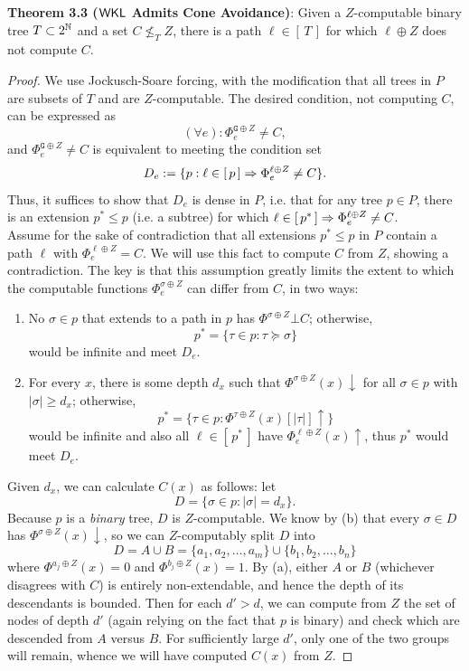 \documentclass{amsart}
\begin{document}
	\noindent \textbf{Theorem 3.3 ($\sf{WKL}$ Admits Cone Avoidance)}: Given a $Z$-computable binary tree $T\subset 2^{\mathbb{N}}$ and a set $C\nleq_T Z$, there is a path $\ell\in [\,T\,]$ for which $\ell\oplus Z$ does not compute $C$. 
	\begin{proof}
		We use Jockusch-Soare forcing, with the modification that all trees in $P$ are subsets of $T$ and are $Z$-computable. The desired condition, not computing $C$, can be expressed as
		$$
		(\forall e): \Phi_e^{\mathtt{G}\oplus Z}\neq C,
		$$
		and $\Phi_e^{\mathtt{G}\oplus Z} \neq C$ is equivalent to meeting the condition set
		$$
		D_e := \{p: \ell \in [\, p \,] \Rightarrow \Phi_e^{\ell\oplus Z}\neq C\}.
		$$
		Thus, it suffices to show that $D_e$ is dense in $P$, i.e. that for any tree $p\in P$, there is an extension $p^*\leq p$ (i.e. a subtree) for which $\ell\in [\,p^*\,] \Rightarrow \Phi_e^{\ell\oplus Z}\neq C$.\\
		
		Assume for the sake of contradiction that all extensions $p^*\leq p$ in $P$ contain a path $\ell$ with $\Phi_e^{\ell\oplus Z}=C$. We will use this fact to compute $C$ from $Z$, showing a contradiction. The key is that this assumption greatly limits the extent to which the computable functions $\Phi_e^{\sigma\oplus Z}$ can differ from $C$, in two ways:
		\begin{enumerate}[label=(\alph*)]
			\item No $\sigma\in p$ that extends to a path in $p$ has $\Phi^{\sigma\oplus Z}\bot C$; otherwise,
			$$p^*=\{\tau\in p :\tau\succeq \sigma \}$$ 
			would be infinite and meet $D_e$.
			\item For every $x$, there is some depth $d_x$ such that $\Phi^{\sigma\oplus Z}(x)\downarrow$ for all $\sigma\in p$ with $|\sigma|\geq d_x$; otherwise, 
			$$p^*=\{\tau\in p:\Phi^{\tau\oplus Z}(x)[|\tau|]\uparrow \}$$
			would be infinite and also all $\ell\in [\,p^*\,]$ have $\Phi_e^{\ell\oplus Z}(x)\uparrow$, thus $p^*$ would meet $D_e$.
		\end{enumerate}
		Given $d_x$, we can calculate $C(x)$ as follows: let 
		$$D = \{\sigma\in p : |\sigma| = d_x\}.$$
		Because $p$ is a \textit{binary} tree, $D$ is $Z$-computable. We know by (b) that every $\sigma\in D$ has $\Phi^{\sigma\oplus Z}(x)\downarrow$, so we can $Z$-computably split $D$ into 
		$$
		D = A\cup B = \{a_1,a_2,\dots,a_m\}\cup \{b_1,b_2,\dots,b_n\}
		$$
		where $\Phi^{a_j\oplus Z}(x)=0$ and $\Phi^{b_j\oplus Z}(x)=1$. By (a), either $A$ or $B$ (whichever disagrees with $C$) is entirely non-extendable, and hence the depth of its descendants is bounded. Then for each $d'>d$, we can compute from $Z$ the set of nodes of depth $d'$ (again relying on the fact that $p$ is binary) and check which are descended from $A$ versus $B$. For sufficiently large $d'$, only one of the two groups will remain, whence we will have computed $C(x)$ from $Z$.
	\end{proof}\\
	
\end{document}
